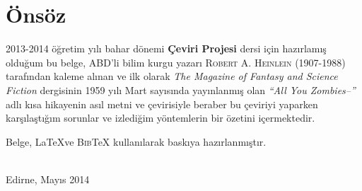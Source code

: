 
\thispagestyle{empty}
\chapter*{Önsöz}

2013-2014 öğretim yılı bahar dönemi \textbf{Çeviri Projesi} dersi için hazırlamış
olduğum bu belge, ABD'li bilim kurgu yazarı \textsc{Robert A.  Heinlein}
(1907-1988) tarafından kaleme alınan ve ilk olarak \emph{The Magazine of
Fantasy and Science Fiction} dergisinin 1959 yılı Mart sayısında yayınlanmış
olan \emph{``All You Zombies--''} adlı kısa hikayenin asıl metni ve çevirisiyle
beraber bu çeviriyi yaparken karşılaştığım sorunlar ve izlediğim yöntemlerin bir
özetini içermektedir.

Belge, \LaTeX ve \textsc{Bib}\negthinspace\TeX\hspace{1pt} kullanılarak baskıya hazırlanmıştır.

\begin{flushright}
  \textsc{\theauthor}\\
  Edirne, Mayıs 2014
\end{flushright}
